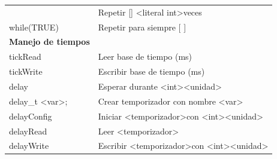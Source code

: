\begin{longtable}[c]{ll}
                                              & Repetir {[}{]} \textless literal int\textgreater veces                                                                                                                              \\
while(TRUE)                                   & Repetir para siempre {[} {]}                                                                                                                                                        \\ \hline
\textbf{Manejo de tiempos}                    &                                                                                                                                                                                     \\ \hline
tickRead                                      & Leer base de tiempo (ms)                                                                                                                                                            \\
tickWrite                                     & Escribir base de tiempo (ms)                                                                                                                                                        \\
delay                                         & Esperar durante \textless int\textgreater \textless unidad\textgreater                                                                                                              \\
delay\_t \textless var\textgreater;           & Crear temporizador con nombre \textless var\textgreater                                                                                                                             \\
delayConfig                                   & Iniciar \textless temporizador\textgreater con \textless int\textgreater \textless unidad\textgreater                                                                               \\
delayRead                                     & Leer \textless temporizador\textgreater                                                                                                                                             \\
delayWrite                                    & Escribir \textless temporizador\textgreater con \textless int\textgreater \textless unidad\textgreater                                                                              \\ \hline

\end{longtable}

